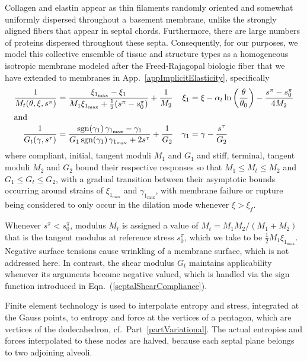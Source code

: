 Collagen and elastin appear as thin filaments randomly oriented and somewhat uniformly dispersed throughout a basement membrane, unlike the strongly aligned fibers that appear in septal chords.  Furthermore, there are large numbers of proteins dispersed throughout these septa.  Consequently, for our purposes, we model this collective ensemble of tissue and structure types as a homo\-geneous isotropic membrane modeled after the Freed-Rajagopal biologic fiber \cite{FreedRajagopal16} that we have extended to membranes \cite{Freedetal17} in App.~\ref{appImplicitElasticity}, specifically
\begin{subequations}
    \label{septalCompliances}
    \begin{align}
    \frac{1}{M_t(\theta, \xi, s^{\pi})} & = 
    \frac{\xi_{1_{\max}} - \xi_1}
    {M_1 \xi_{1_{\max}} + \tfrac{1}{2}(s^{\pi} - s^{\pi}_0)} + \frac{1}{M_2} 
    & \xi_1 & = \xi - \alpha_t \ln 
    \left( \frac{\theta}{\theta_0} \right) - \frac{s^{\pi} - s^{\pi}_0}{4M_2}
    \label{septalDilationCompliance} \\
    \intertext{and}
    \frac{1}{G_t(\gamma , s^{\tau})} & = \frac{ \mathrm{sgn} (\gamma_1) \, \gamma_{1_{\max}} - \gamma_1}{G_1 \, \mathrm{sgn} (\gamma_1) \, \gamma_{1_{\max}} + 2 s^{\tau}} + \frac{1}{G_2} & 
    \gamma_1 & = \gamma - \frac{s^{\tau}}{G_2}
    \label{septalShearCompliance}
    \end{align}
\end{subequations}
where compliant, initial, tangent moduli $M_1$ and $G_1$ and stiff, terminal, tangent moduli $M_2$ and $G_2$ bound their respective responses so that $M_1 \leq M_t \leq M_2$ and $G_1 \leq G_t \leq G_2$, with a gradual transition between their asymp\-totic bounds occurring around strains of $\xi_{1_{\max}}$ and $\gamma_{1_{\max}}$, with membrane failure or rupture being considered to only occur in the dilation mode whenever $\xi > \xi_f$.

Whenever $s^{\pi} < s^{\pi}_0$, modulus $M_t$ is assigned a value of $M_t = M_1 M_2 / ( M_1 + M_2 )$ that is the tangent modulus at reference stress $s^{\pi}_0$, which we take to be $\tfrac{1}{2} M_1 \xi_{1_{\max}}$.   Negative surface tensions cause wrinkling of a membrane surface, which is not addressed here.  In contrast, the shear modulus $G_t$ maintains applicability whenever its arguments become negative valued, which is handled via the sign function introduced in Eqn.~(\ref{septalShearCompliance}).

Finite element technology is used to interpolate entropy and stress, integrated at the Gauss points, to entropy and force at the vertices of a pentagon, which are vertices of the dodecahedron, cf.\ Part~\ref{partVariational}.  The actual entropies and forces interpolated to these nodes are halved, because each septal plane belongs to two adjoining alveoli. 


